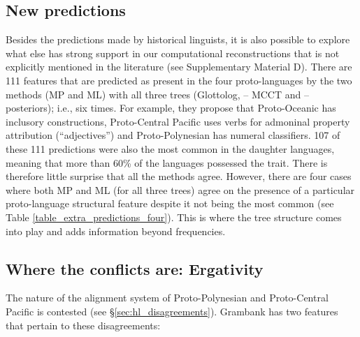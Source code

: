 \documentclass[12pt,letterpaper]{article}
\begin{document}
\FloatBarrier
\subsection{New predictions}
\label{sec:new_predictions}

Besides the predictions made by historical linguists, it is also possible to explore what else has strong support in our computational reconstructions that is not explicitly mentioned in the literature (see Supplementary Material D). There are 111 features that are predicted as present in the four proto-languages by the two methods (MP and ML) with all three trees (Glottolog, \citealt{grayetal_2009} -- MCCT and \citealt{grayetal_2009} -- posteriors); i.e., six times. For example, they propose that Proto-Oceanic has inclusory constructions, Proto-Central Pacific uses verbs for admoninal property attribution (``adjectives'') and Proto-Polynesian has numeral classifiers. 107 of these 111 predictions were also the most common in the daughter languages, meaning that more than 60\% of the languages possessed the trait. There is therefore little surprise that all the methods agree. However, there are four cases where both MP and ML (for all three trees) agree on the presence of a particular proto-language structural feature despite it not being the most common (see Table \ref{table_extra_predictions_four}). This is where the tree structure comes into play and adds information beyond frequencies.






\FloatBarrier
\subsection{Where the conflicts are: Ergativity}
\label{sec:conflicts}
The nature of the alignment system of Proto-Polynesian and Proto-Central Pacific is contested (see §\ref{sec:hl_disagreements}). Grambank has two features that pertain to these disagreements:
\end{document}
